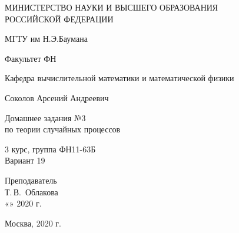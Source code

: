 \documentclass[14pt,a4paper]{scrartcl}
\begin{document}
	\begin{titlepage}
	\begin{center}
		\large
		МИНИСТЕРСТВО НАУКИ И ВЫСШЕГО ОБРАЗОВАНИЯ\\ РОССИЙСКОЙ ФЕДЕРАЦИИ
		
		\vspace{0.5cm}
		
		МГТУ им Н.Э.Баумана
		\vspace{0.25cm}
		
		Факультет ФН
		
		Кафедра вычислительной математики и математической физики
		\vfill
		
		
		Соколов Арсений Андреевич\\
		\vfill
		
		
		{\LARGE Домашнее задания №3 \\ по теории случайных процессов\\[2mm]
		}
		\bigskip
		
		3 курс, группа ФН11-63Б\\
		Вариант 19
	\end{center}
	\vfill
	
	\newlength{\ML}
	\hfill\begin{minipage}{0.4\textwidth}
		Преподаватель\\
		\underline{\hspace{3cm}} Т.\,В.~Облакова\\
		«\underline{\hspace{0.7cm}}» \underline{\hspace{1.71cm}} 2020 г.
	\end{minipage}%
	\bigskip
	
	
	\vfill
	
	\begin{center}
		Москва, 2020 г.
	\end{center}
\end{titlepage}
\end{document}
